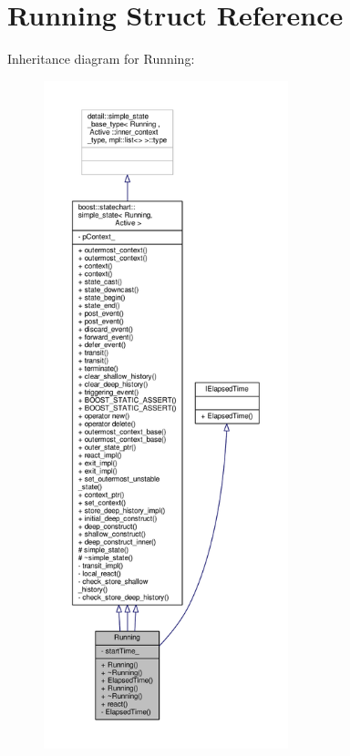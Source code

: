 \hypertarget{struct_running}{}\section{Running Struct Reference}
\label{struct_running}


Inheritance diagram for Running\+:
\nopagebreak
\begin{figure}[H]
\begin{center}
\leavevmode
\includegraphics[height=550pt]{struct_running__inherit__graph}
\end{center}
\end{figure}


